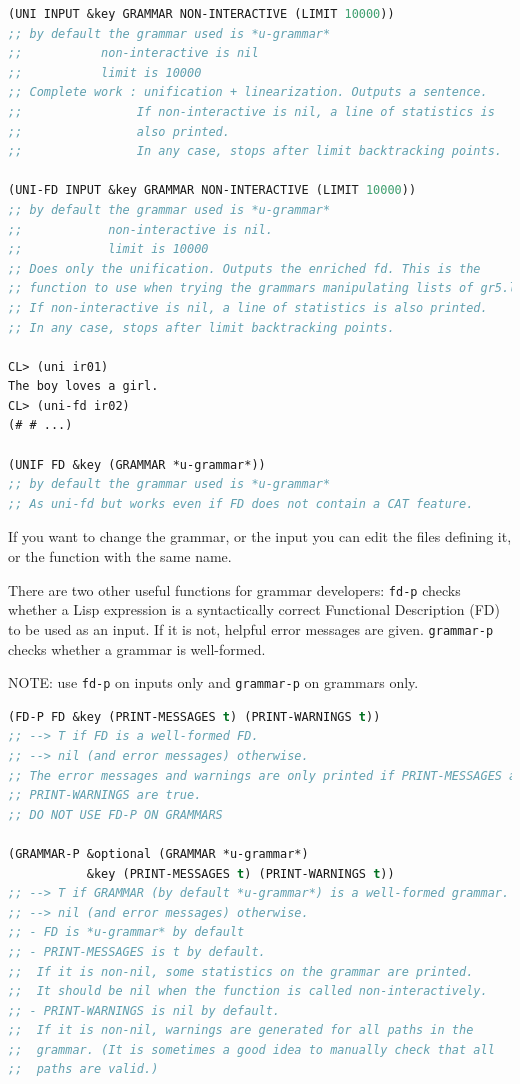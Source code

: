 \documentclass[10pt,a4paper]{report}
\begin{document}
\begin{lstlisting}[language=Lisp]   
(UNI INPUT &key GRAMMAR NON-INTERACTIVE (LIMIT 10000))
;; by default the grammar used is *u-grammar*
;;           non-interactive is nil
;;           limit is 10000
;; Complete work : unification + linearization. Outputs a sentence.
;;                If non-interactive is nil, a line of statistics is
;;                also printed.
;;                In any case, stops after limit backtracking points.

(UNI-FD INPUT &key GRAMMAR NON-INTERACTIVE (LIMIT 10000))
;; by default the grammar used is *u-grammar*
;;            non-interactive is nil.
;;            limit is 10000
;; Does only the unification. Outputs the enriched fd. This is the
;; function to use when trying the grammars manipulating lists of gr5.l
;; If non-interactive is nil, a line of statistics is also printed.
;; In any case, stops after limit backtracking points.

CL> (uni ir01)
The boy loves a girl.
CL> (uni-fd ir02)
(# # ...)

(UNIF FD &key (GRAMMAR *u-grammar*))
;; by default the grammar used is *u-grammar*
;; As uni-fd but works even if FD does not contain a CAT feature.      
\end{lstlisting}   

If you want to change the grammar, or the input you can edit the files
defining it, or the function with the same name.

There are two other useful functions for grammar developers: {\tt fd-p}
checks whether a Lisp expression is a syntactically correct Functional
Description (FD) to be used as an input.  If it is not, helpful error
messages are given.  {\tt grammar-p} checks whether a grammar is well-formed.

NOTE: use {\tt fd-p} on inputs only and {\tt grammar-p} on grammars only.

\begin{lstlisting}[language=Lisp]
(FD-P FD &key (PRINT-MESSAGES t) (PRINT-WARNINGS t))
;; --> T if FD is a well-formed FD.
;; --> nil (and error messages) otherwise.
;; The error messages and warnings are only printed if PRINT-MESSAGES and
;; PRINT-WARNINGS are true.
;; DO NOT USE FD-P ON GRAMMARS 

(GRAMMAR-P &optional (GRAMMAR *u-grammar*) 
           &key (PRINT-MESSAGES t) (PRINT-WARNINGS t))
;; --> T if GRAMMAR (by default *u-grammar*) is a well-formed grammar.
;; --> nil (and error messages) otherwise.
;; - FD is *u-grammar* by default
;; - PRINT-MESSAGES is t by default.
;;  If it is non-nil, some statistics on the grammar are printed.
;;  It should be nil when the function is called non-interactively.
;; - PRINT-WARNINGS is nil by default.
;;  If it is non-nil, warnings are generated for all paths in the
;;  grammar. (It is sometimes a good idea to manually check that all 
;;  paths are valid.)
\end{lstlisting}
\end{document}
